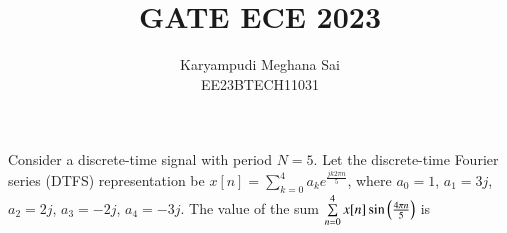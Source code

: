 \documentclass[journal,12pt,onecolumn]{IEEEtran}
\theoremstyle{remark}
\begin{document}
\let\vec\mathbf







\bigskip



\title{GATE ECE 2023}
\author{Karyampudi Meghana Sai\\ EE23BTECH11031}
\maketitle
Consider a discrete-time signal with period $N=5$. Let the discrete-time Fourier series (DTFS) representation be $x[n]=\sum\limits_{k=0}^{4} a_k e^{\frac{jk2\pi n}{5}}$, where $a_0=1$, $a_1=3j$, $a_2=2j$, $a_3=-2j$, $a_4=-3j$. The value of the sum $\sum\limits_{n=0}^{4}x[n] \sin\left(\frac{4\pi n}{5}\right)$ is\\


\solution\\
\end{document}
